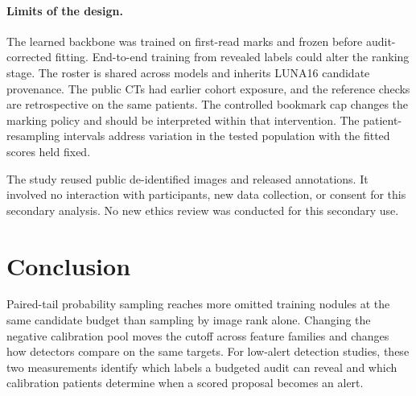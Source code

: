 \paragraph{Limits of the design.}
The learned backbone was trained on first-read marks and frozen before audit-corrected fitting. End-to-end training from revealed labels could alter the ranking stage. The roster is shared across models and inherits LUNA16 candidate provenance. The public CTs had earlier cohort exposure, and the reference checks are retrospective on the same patients. The controlled bookmark cap changes the marking policy and should be interpreted within that intervention. The patient-resampling intervals address variation in the tested population with the fitted scores held fixed.

The study reused public de-identified images and released annotations. It involved no interaction with participants, new data collection, or consent for this secondary analysis. No new ethics review was conducted for this secondary use.

\section{Conclusion}

Paired-tail probability sampling reaches more omitted training nodules at the same candidate budget than sampling by image rank alone. Changing the negative calibration pool moves the cutoff across feature families and changes how detectors compare on the same targets. For low-alert detection studies, these two measurements identify which labels a budgeted audit can reveal and which calibration patients determine when a scored proposal becomes an alert.
